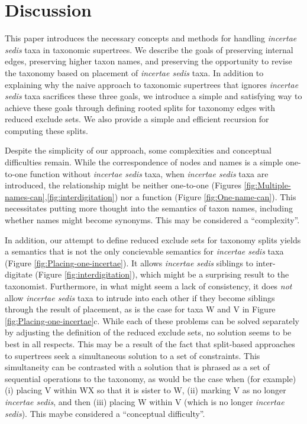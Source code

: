 \documentclass[english]{article}
\begin{document}
\section{Discussion}

This paper introduces the necessary concepts and methods for handling \emph{incertae sedis}
taxa in taxonomic supertrees.
We describe the goals of preserving internal edges,
preserving higher taxon names, and preserving the opportunity to revise the taxonomy
based on placement of \emph{incertae sedis} taxa.
In addition to explaining why
the naive approach to taxonomic supertrees that ignores \emph{incertae sedis}
 taxa sacrifices these three goals, we introduce a simple and satisfying way to achieve these goals
through defining rooted splits for taxonomy edges with reduced exclude sets.
We also
provide a simple and efficient recursion for computing these splits.

Despite the simplicity of our approach, some complexities and conceptual difficulties
remain.
While the correspondence of nodes and names is a simple one-to-one function
without \emph{incertae sedis} taxa, when \emph{incertae sedis} taxa are
introduced, the relationship might be neither one-to-one (Figures
\ref{fig:Multiple-names-can},\ref{fig:interdigitation}) nor a function (Figure \ref{fig:One-name-can}).
This necessitates putting more thought into the semantics of taxon names, including
whether names might become synonyms.  This may be considered a ``complexity''.

In addition, our attempt to define reduced exclude sets for taxonomy splits yields
a semantics that is not the only concievable semantics for \emph{incertae sedis}
taxa (Figure \ref{fig:Placing-one-incertae}).  It allows \emph{incertae sedis} siblings to inter-digitate
(Figure \ref{fig:interdigitation}), which might be a surprising result to the taxonomist.  Furthermore,
in what might seem a lack of consistency, it does \emph{not} allow \emph{incertae sedis}
taxa to intrude into each other if they become siblings through the result of
placement, as is the case for taxa W and V in Figure \ref{fig:Placing-one-incertae}c.
While each of these problems can be solved separately by adjusting the definition of the
reduced exclude sets, no solution seems to be best in all respects.  This may be a result
of the fact that split-based approaches to supertrees seek a simultaneous solution to a set
of constraints.  This simultaneity can be contrasted with a solution that is phrased
as a set of sequential operations to the taxonomy, as would be the case when (for example)
(i) placing V within WX so that it is sister to W, (ii) marking V as no longer \emph{incertae sedis}, and then (iii)
placing W within V (which is no longer \emph{incertae sedis}).  This maybe considered a ``conceptual difficulty''.
\end{document}
